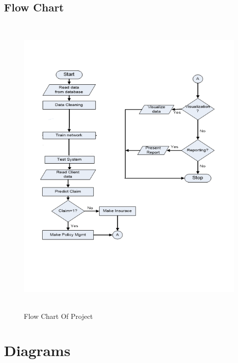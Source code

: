 \subsection{Flow Chart}
\begin{figure}[tbh] %
\begin{center}
	\includegraphics[height=6in]{images/systemflow.png}
	\caption{Flow Chart Of Project} %
	
	\label{Flow Chart} %
\end{center}
\end{figure}
\newpage

\section{Diagrams}
